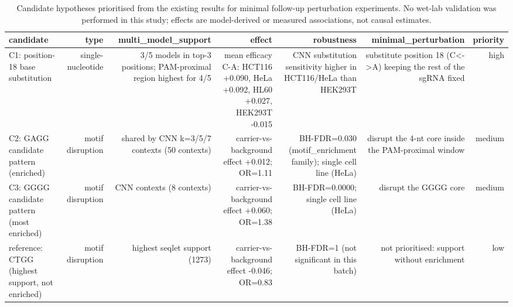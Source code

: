 \begin{table}[htbp]
\centering
\footnotesize
\caption{Candidate hypotheses prioritised from the existing results for minimal follow-up perturbation experiments. No wet-lab validation was performed in this study; effects are model-derived or measured associations, not causal estimates.}
\label{tab:candidates}
\begin{tabular}{lrrrrrr}
\toprule
candidate & type & multi\_model\_support & effect & robustness & minimal\_perturbation & priority \\
\midrule
C1: position-18 base substitution & single-nucleotide & 3/5 models in top-3 positions; PAM-proximal region highest for 4/5 & mean efficacy C-A: HCT116 +0.090, HeLa +0.092, HL60 +0.027, HEK293T -0.015 & CNN substitution sensitivity higher in HCT116/HeLa than HEK293T & substitute position 18 (C<->A) keeping the rest of the sgRNA fixed & high \\
C2: GAGG candidate pattern (enriched) & motif disruption & shared by CNN k=3/5/7 contexts (50 contexts) & carrier-vs-background effect +0.012; OR=1.11 & BH-FDR=0.030 (motif\_enrichment family); single cell line (HeLa) & disrupt the 4-nt core inside the PAM-proximal window & medium \\
C3: GGGG candidate pattern (most enriched) & motif disruption & CNN contexts (8 contexts) & carrier-vs-background effect +0.060; OR=1.38 & BH-FDR=0.0000; single cell line (HeLa) & disrupt the GGGG core & medium \\
reference: CTGG (highest support, not enriched) & motif disruption & highest seqlet support (1273) & carrier-vs-background effect -0.046; OR=0.83 & BH-FDR=1 (not significant in this batch) & not prioritised: support without enrichment & low \\
\bottomrule
\end{tabular}
\end{table}
